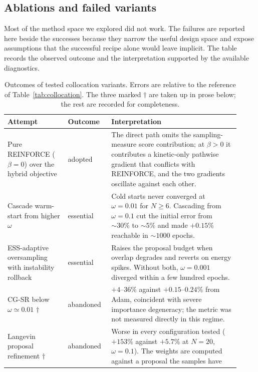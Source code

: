 \subsection{Ablations and failed variants}
\label{sec:colloc-negatives}

Most of the method space we explored did not work. The failures are reported here beside
the successes because they narrow the useful design space and expose assumptions that the
successful recipe alone would leave implicit. The table records the observed outcome and
the interpretation supported by the available diagnostics.

\begin{table}[htbp]\centering
\caption[Outcomes of tested collocation variants]{Outcomes of tested collocation variants. Errors are relative to
the reference of Table~\ref{tab:collocation}. The three marked $\dagger$ are taken up in
prose below; the rest are recorded for completeness.}
\label{tab:colloc-variants}
\small
\setlength{\tabcolsep}{5pt}
\renewcommand{\arraystretch}{1.15}
\begin{tabular}{@{}p{0.24\linewidth} p{0.17\linewidth} p{0.51\linewidth}@{}}
\toprule
Attempt & Outcome & Interpretation \\
\midrule
Pure REINFORCE ($\beta{=}0$) over the hybrid objective
  & adopted
  & The direct path omits the sampling-measure score contribution; at
    $\beta>0$ it contributes a kinetic-only pathwise gradient that conflicts with REINFORCE,
    and the two gradients oscillate against each other. \\
Cascade warm-start from higher $\omega$
  & essential
  & Cold starts never converged at $\omega{=}0.01$ for $N\ge6$. Cascading from
    $\omega{=}0.1$ cut the initial error from ${\sim}30\%$ to ${\sim}5\%$ and made
    $+0.15\%$ reachable in ${\sim}1000$ epochs. \\
ESS-adaptive oversampling with instability rollback
  & essential
  & Raises the proposal budget when overlap degrades and reverts on energy spikes.
    Without both, $\omega{=}0.001$ diverged within a few hundred epochs. \\
CG-SR below $\omega\simeq0.01$ $\dagger$
  & abandoned
  & $+4$--$36\%$ against $+0.15$--$0.24\%$ from Adam, coincident with severe importance
    degeneracy; the metric was not measured directly in this regime. \\
Langevin proposal refinement $\dagger$
  & abandoned
  & Worse in every configuration tested ($+153\%$ against $+5.7\%$ at $N{=}20$,
    $\omega{=}0.1$). The weights are computed against a proposal the samples have

\end{tabular}
\end{table}
